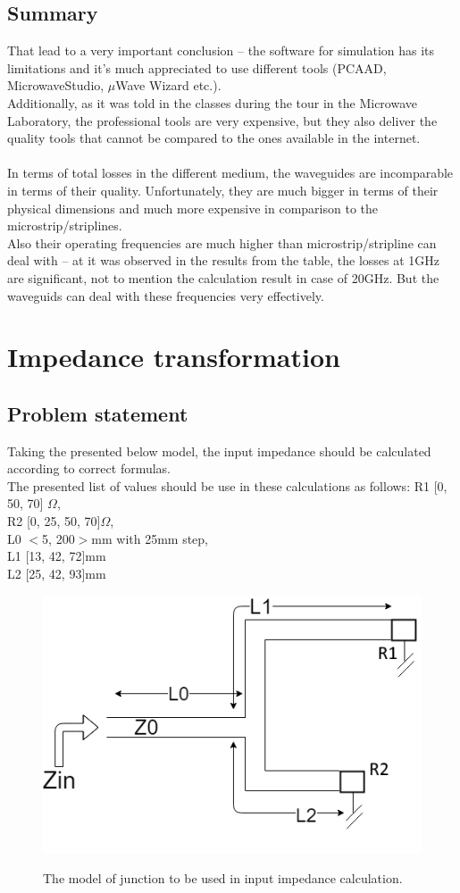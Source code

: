 \documentclass[eng,printmode]{mgr}
\begin{document}
\section{Summary}
That lead to a very important conclusion -- the software for simulation has its limitations and it's much appreciated to use different tools (PCAAD, MicrowaveStudio, $\mu$Wave Wizard etc.).\\
Additionally, as it was told in the classes during the tour in the Microwave Laboratory, the professional tools are very expensive, but they also deliver the quality tools that cannot be compared to the ones available in the internet. 
\\
\\
In terms of total losses in the different medium, the waveguides are incomparable in terms of their quality. Unfortunately, they are much bigger in terms of their physical dimensions and much more expensive in comparison to the microstrip/striplines.\\
Also their operating frequencies are much higher than microstrip/stripline can deal with -- at it was observed in the results from the table, the losses at 1GHz are significant, not to mention the calculation result in case of 20GHz. But the waveguids can deal with these frequencies very effectively.

\chapter{Impedance transformation}
\section{Problem statement}
Taking the presented below model, the input impedance should be calculated according to correct formulas.\\
The presented list of values should be use in these calculations as follows:
R1 [0, 50, 70] $\Omega$,\\
R2 [0, 25, 50, 70]$\Omega$,\\
L0 $<$5, 200$>$mm with 25mm step,\\
L1 [13, 42, 72]mm\\
L2 [25, 42, 93]mm\\
\begin{figure}[h]
	\centering
	\includegraphics[width=0.4\linewidth]{impedance}
	\label{fig:impedance}
	\caption{The model of junction to be used in input impedance calculation.}
\end{figure}
\end{document}
